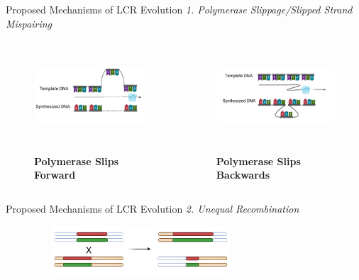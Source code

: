 \documentclass{beamer}
\begin{document}
	\begin{frame}{Proposed Mechanisms of LCR Evolution}
		\textit{1. Polymerase Slippage/Slipped Strand Mispairing}
		\begin{columns}
			
			\centering
			\begin{figure}
				\includegraphics[width=\columnwidth, height=2.5cm]{slippage2n.png} \\~\\
				\caption{\centering \textbf{Polymerase Slips Forward}}
			\end{figure}
			
			\centering
			\begin{figure}
				\vspace{0.5cm}
				\includegraphics[width=\columnwidth, height=2.5cm]{slippage1n.png} \\~\\
				\caption{\centering \textbf{Polymerase Slips Backwards}}
			\end{figure}
		
		\end{columns}
	
	\end{frame}

	\begin{frame}{Proposed Mechanisms of LCR Evolution}
		\textit{2. Unequal Recombination} \newline\newline
		
		\begin{figure}
			\includegraphics[width=8cm, height=1.8cm]{unequal.png} \\~\\
		\end{figure}
		
	\end{frame}
	
\end{document}
